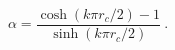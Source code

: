 \begin{equation} 
	\alpha=\frac{\cosh(k\pi r_{c}/2)- 1}{\sinh(k\pi r_{c}/2)}\ .
      \end{equation} 
